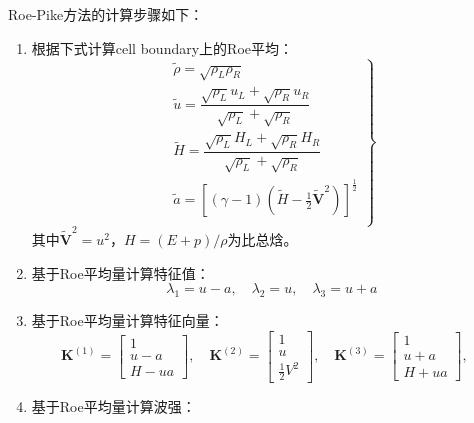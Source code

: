 \documentclass[11pt]{article}
\begin{document}
Roe-Pike方法的计算步骤如下：
\begin{enumerate}
	\item 根据下式计算cell boundary上的Roe平均：
	      \begin{equation}
		      \left.\begin{array}{l}
			      \tilde{\rho}=\sqrt{\rho_L\rho_R}                                                                  \\[8pt]
			      \tilde{u}=\dfrac{\sqrt{\rho_L}u_L+\sqrt{\rho_R}u_R}{\sqrt{\rho_L}+\sqrt{\rho_R}}                  \\[8pt]
			      \tilde{H}=\dfrac{\sqrt{\rho_L}H_L+\sqrt{\rho_R}H_R}{\sqrt{\rho_L}+\sqrt{\rho_R}}                  \\[8pt]
			      \tilde{a}=\left[(\gamma-1)\left(\tilde{H}-\frac{1}{2}\tilde{\bm{V}}^2\right)\right]^{\frac{1}{2}} \\
		      \end{array}\right\}
	      \end{equation}
	      其中$\tilde{\bm{V}}^2=u^2$，$H=(E+p)/\rho$为比总焓。
	\item 基于Roe平均量计算特征值：
	      \begin{equation}
		      \lambda_1=u-a,\quad\lambda_2=u,\quad\lambda_3=u+a
	      \end{equation}
	\item 基于Roe平均量计算特征向量：
	      \begin{equation}
		      \bm{K}^{(1)}=\left[\begin{matrix}
				      1   \\
				      u-a \\
				      H-ua
			      \end{matrix}\right],\quad
		      \bm{K}^{(2)}=\left[\begin{matrix}
				      1 \\
				      u \\
				      \frac{1}{2}V^2
			      \end{matrix}\right],\quad
		      \bm{K}^{(3)}=\left[\begin{matrix}
				      1   \\
				      u+a \\
				      H+ua
			      \end{matrix}\right],\quad
	      \end{equation}
	\item 基于Roe平均量计算波强：
	      \begin{equation}
		      \left.\begin{array}{l}

\end{array}
\end{equation}
\end{enumerate}
\end{document}
